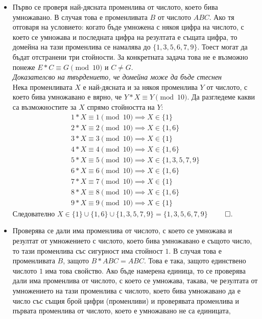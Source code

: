 \documentclass[a4paper, 12pt]{article}
\begin{document}
\begin{itemize}
\item Първо се проверя най-дясната променлива от числото, което бива умножавано.
В случая това е променливата \(B\) от числото \(ABC\).
Ако тя отговаря на условието: когато бъде умножена с някоя цифра на числото, с което се умножава и последната цифра на резултата е същата цифра,
то домейна на тази променлива се намалява до \(\{1, 3, 5, 6, 7, 9\}\). Тоест могат да бъдат отстранени три стойности.
За конкретната задача това не е възможно понеже \(E * C \equiv G \pmod{10}\) и \(C \neq G\). \\
\textit{Доказателсво на твърдението, че домейна може да бъде стеснен} \\
Нека променливата \(X\) е най-дясната и за някоя променлива \(Y\) от числото, с което бива умножавано е вярно,
че \(Y * X \equiv Y \pmod{10}\). Да разгледеме какви са възможностите за \(X\) спрямо стойността на \(Y\):
\begin{align*}
    1 * X \equiv 1 \pmod{10} \implies X \in \{1\} \\
    2 * X \equiv 2 \pmod{10} \implies X \in \{1, 6\} \\
    3 * X \equiv 3 \pmod{10} \implies X \in \{1\} \\
    4 * X \equiv 4 \pmod{10} \implies X \in \{1, 6\} \\
    5 * X \equiv 5 \pmod{10} \implies X \in \{1, 3, 5, 7, 9\} \\
    6 * X \equiv 6 \pmod{10} \implies X \in \{1, 6\} \\
    7 * X \equiv 7 \pmod{10} \implies X \in \{1\} \\
    8 * X \equiv 8 \pmod{10} \implies X \in \{1, 6\} \\
    9 * X \equiv 9 \pmod{10} \implies X \in \{1\}
\end{align*}
Следователно \(X \in \{1\} \cup \{1, 6\} \cup \{1, 3, 5, 7, 9\} = \{1, 3, 5, 6, 7, 9\}\) \(\qed\).
\item Проверява се дали има променлива от числото, с което се умножава и резултат от умножението с числото,
което бива умножавано е същото число, то тази променлива със сигурност има стойност \(1\).
В случая това е променливата \(B\), защото \(B * ABC = ABC\).
Това е така, защото единствено числото \(1\) има това свойство.
Ако бъде намерена единица, то се проверява дали има променлива от числото, с което се умножава,
такава, че резултата от умножението на тази променлива с числото, което бива умножавано да е число със същия брой цифри (променливи) и проверявата променлива и първата променлива от числото, което е умножавано не са единицата,

\end{itemize}
\end{document}
